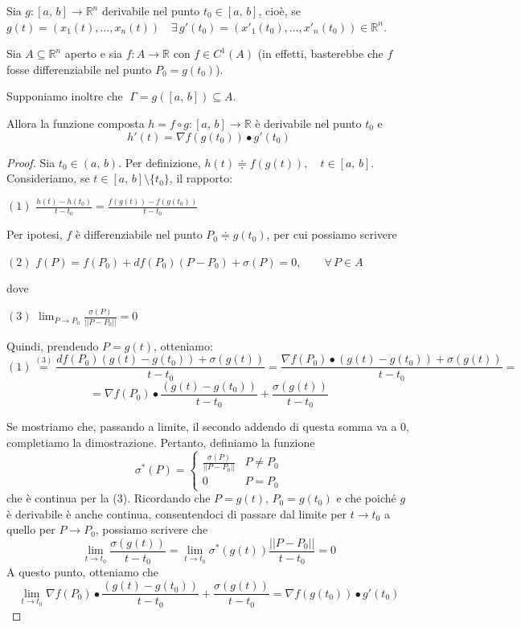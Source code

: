 \begin{proposition}
Sia $g:[a,\,b] \longrightarrow \mathbb{R}^n$ derivabile nel punto $t_0 \in [a,\,b]$, cioè, se $g(t) = (x_1(t),\ldots,x_n(t)) \quad \exists \, g'(t_0) = (x'_1(t_0),\ldots,x'_n(t_0)) \in \mathbb{R}^n$.

Sia $A \subseteq \mathbb{R}^n$ aperto e sia $f : A \longrightarrow \mathbb{R}$ con $f \in C^1(A)$ (in effetti, basterebbe che $f$ fosse differenziabile nel punto $P_0 = g(t_0)$).

Supponiamo inoltre che $\; \Gamma = g([a,\,b]) \subseteq A$.

Allora la funzione composta $h = f \circ g : [a,\,b] \longrightarrow \mathbb{R}$ è derivabile nel punto $t_0$ e
$$
h'(t) = \nabla f(g(t_0)) \bullet g'(t_0)
$$
\end{proposition}
\begin{proof}
Sia $t_0 \in (a,\,b)$. Per definizione, $h(t) \doteqdot f(g(t)), \quad t \in [a,\,b]$. Consideriamo, se $t \in [a,\,b] \setminus \lbrace t_0 \rbrace$, il rapporto:
\begin{center}
$\mathrm{(1)}$
\hfill
$\displaystyle \frac{h(t)-h(t_0)}{t-t_0} = \frac{f(g(t))-f(g(t_0))}{t-t_0}$
\hfill \null \\
\end{center}
Per ipotesi, $f$ è differenziabile nel punto $P_0 \doteqdot g(t_0)$, per cui possiamo scrivere
\begin{center}
$\mathrm{(2)}$
\hfill
$\displaystyle f(P) = f(P_0) +df(P_0)(P-P_0) + \sigma(P) = 0, \qquad \forall \, P \in A$
\hfill \null \\
\end{center}
dove
\begin{center}
$\mathrm{(3)}$
\hfill
$\displaystyle \lim_{P \rightarrow P_0} \frac{\sigma(P)}{||P-P_0||} = 0$
\hfill \null \\
\end{center}
Quindi, prendendo $P = g(t)$, otteniamo:
$$\mathrm{(1)} \overset{\mathrm{(3)}}{=} \frac{df(P_0)(g(t)-g(t_0)) + \sigma(g(t))}{t-t_0} = \frac{\nabla f(P_0) \bullet (g(t)-g(t_0)) + \sigma(g(t))}{t-t_0}  = $$
$$ = \nabla f(P_0) \bullet \frac{(g(t)-g(t_0))}{t-t_0} + \frac{\sigma(g(t))}{t-t_0}$$

Se mostriamo che, passando a limite, il secondo addendo di questa somma va a $0$, completiamo la dimostrazione. Pertanto, definiamo la funzione
$$
\sigma^*(P) =
\begin{cases}
\displaystyle \frac{\sigma(P)}{||P-P_0||} & P \neq P_0 \\
0 & P = P_0
\end{cases}
$$
che è continua per la (3). Ricordando che $P = g(t)$, $P_0 = g(t_0)$ e che poiché $g$ è derivabile è anche continua, consentendoci di passare dal limite per $t \rightarrow t_0$ a quello per $P \rightarrow P_0$, possiamo scrivere che
$$\lim_{t \rightarrow t_0} \frac{\sigma(g(t))}{t-t_0} = \lim_{t \rightarrow t_0} \sigma^*(g(t)) \frac{||P-P_0||}{t-t_0} = 0$$
A questo punto, otteniamo che
$$
\lim_{t \rightarrow t_0} \nabla f(P_0) \bullet \frac{(g(t)-g(t_0))}{t-t_0} + \frac{\sigma(g(t))}{t-t_0} =
\nabla f(g(t_0)) \bullet g'(t_0)
$$
\end{proof}

